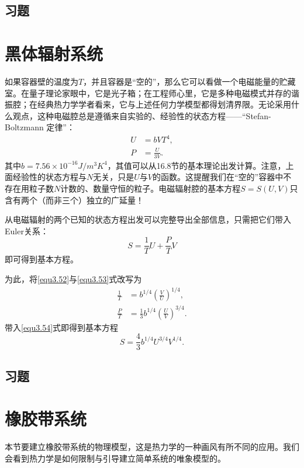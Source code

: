 \subsection*{习题}

\section{黑体辐射系统}
\label{sec3.6}
如果容器壁的温度为$T$，并且容器是“空的”，那么它可以看做一个电磁能量的贮藏室。在量子理论家眼中，它是光子箱；在工程师心里，它是多种电磁模式并存的谐振腔；在经典热力学学者看来，它与上述任何力学模型都得划清界限。无论采用什么观点，这种电磁腔总是遵循来自实验的、经验性的状态方程——“Stefan-Boltzmann 定律”：
\begin{align}
    U &= bVT^4, \label{equ3.52} \\
    P &= \frac{U}{3V}. \label{equ3.53}
\end{align}
其中$b = 7.56 \times 10^{-16} \si{J / m^3 K^4}$，其值可以从16.8节的基本理论出发计算。注意，上面经验性的状态方程与$N$无关，只是$U$与$V$的函数。这提醒我们在“空的”容器中不存在用粒子数$N$计数的、数量守恒的粒子。电磁辐射腔的基本方程$S = S(U, V)$只含有两个（而非三个）独立的广延量！

从电磁辐射的两个已知的状态方程出发可以完整导出全部信息，只需把它们带入Euler关系：
\begin{equation}
    S = \frac{1}{T} U + \frac{P}{T} V
    \label{equ3.54}
\end{equation}
即可得到基本方程。

为此，将\eqref{equ3.52}与\eqref{equ3.53}式改写为
\begin{align}
    \frac{1}{T} &= b^{1/4} \left( \frac{V}{U} \right)^{1/4}, \label{equ3.55} \\
    \frac{P}{T} &= \frac{1}{3} b^{1/4} \left( \frac{U}{V} \right)^{3/4}. \label{equ3.56}
\end{align}
带入\eqref{equ3.54}式即得到基本方程
\begin{equation}
    S = \frac{4}{3} b^{1/4} U^{3/4} V^{1/4}.
\label{equ3.57}
\end{equation}

\subsection*{习题}


\section{橡胶带系统}
\label{sec3.7}
本节要建立橡胶带系统的物理模型，这是热力学的一种画风有所不同的应用。我们会看到热力学是如何限制与引导建立简单系统的唯象模型的。

